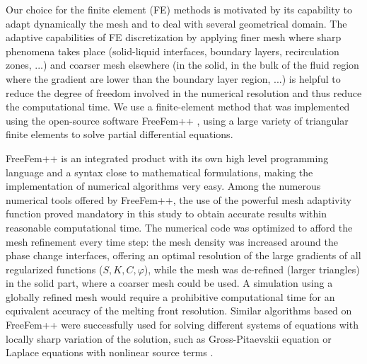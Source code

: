 Our choice for the finite element (FE) methods is motivated by its capability to adapt dynamically the mesh and to deal with several geometrical domain.
The adaptive capabilities of FE discretization by applying finer mesh where sharp phenomena takes place (solid-liquid interfaces, boundary layers, recirculation zones, ...) and coarser mesh elsewhere (in the solid, in the bulk of the fluid region where the gradient are lower than the boundary layer region, ...) is helpful to reduce the degree of freedom involved in the numerical resolution and thus reduce the computational time.
We use a finite-element method that was implemented using the open-source software FreeFem++ \citep{freefem,hecht-2012-JNM}, using a large variety of triangular finite elements  to solve partial differential equations. 

FreeFem++  is an integrated product with its own high level programming language and a syntax close to mathematical formulations, making the implementation of numerical algorithms very easy. Among the numerous numerical tools offered by FreeFem++, the use of the powerful mesh adaptivity function proved mandatory in this study to obtain accurate results within reasonable computational time.
The numerical code was optimized to afford the mesh refinement every time step:  the mesh density was increased around  the phase change interfaces,  offering an optimal resolution of the large gradients of all regularized functions ($S, K, C, \varphi$), while  the mesh was de-refined (larger triangles) in the solid part, where a coarser mesh could be used. A simulation using a globally refined mesh would require a prohibitive computational time for an equivalent accuracy of the melting front resolution. Similar algorithms based on FreeFem++  were successfully used for solving different systems of equations with locally sharp variation of the solution, such as Gross-Pitaevskii equation \citep{dan-2010-JCP,dan-2016-CPC} or  Laplace equations with nonlinear source terms \citep{dan-2013-AMM}. 

